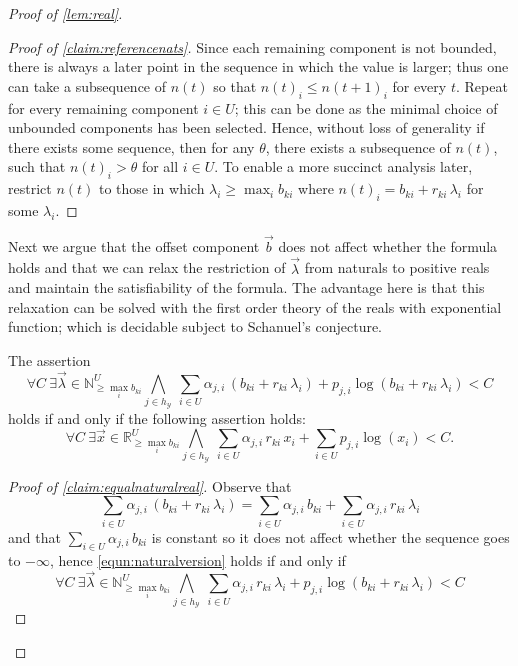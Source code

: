 \documentclass[10pt,a4paper]{amsart}
\numberwithin{equation}{section}
\theoremstyle{plain}
\theoremstyle{definition}
\theoremstyle{remark}
\newenvironment{subproof}[1][\proofname]{\renewcommand{\qedsymbol}{{$\blacksquare$}}\begin{proof}[#1]}{\end{proof}}
\newcommand\revar{x}
\newcommand\revec{\vec{x}}
\newcommand\basevecraw{b}
\newcommand\basevec{\vec{\basevecraw}}
\newcommand\pvecraw{r}
\begin{document}
\begin{proof}[Proof of \cref{lem:real}]
\begin{subproof}[Proof of \cref{claim:referencenats}]
Since each remaining component is not bounded, there is always a later point in the sequence in which the value is larger; thus one can take a subsequence of $n(t)$ so that $n(t)_i \le n(t+1)_i$ for every $t$. Repeat for every remaining component $i \in U$; this can be done as  the minimal choice of unbounded components has been selected. Hence, without loss of generality if there exists some sequence, then for any $\theta$, there exists a subsequence of $n(t)$, such that $n(t)_i > \theta$ for all $i \in U$. To enable a more succinct analysis later, restrict $n(t)$ to those in which $\lambda_i \ge \max_i{\basevecraw_{ki}}$ where $n(t)_i = \basevecraw_{ki} + \pvecraw_{ki} \, \lambda_i$ for some $\lambda_i$.\end{subproof}

Next we argue that the offset component $\basevec$ does not affect whether the formula holds and that  we can relax the restriction of $\vec{\lambda}$ from naturals to positive reals and maintain the satisfiability of the formula.  The advantage here is that this relaxation can be solved with the first order theory of the reals with exponential function; which is decidable subject to Schanuel's conjecture.

\begin{clm}\label{claim:equalnaturalreal}The assertion
\begin{equation}\label{equn:naturalversion}
\forall C\  \exists \vec{\lambda} \in \mathbb{N}^{U}_{\ge \max_i{\basevecraw_{ki}}}
\bigwedge_{j \in h_\mathcal{Y}}\ \sum_{i \in U} \alpha_{j,i}\, (\basevecraw_{ki} + \pvecraw_{ki}\, \lambda_i) +  p_{j,i}\log(\basevecraw_{ki} + \pvecraw_{ki}\, \lambda_i) < C
\end{equation}
holds if and only if  the following assertion holds:
\begin{equation}\label{equn:realsversion}
\forall C\  \exists \revec \in \mathbb{R}^{U}_{\ge \max_i{\basevecraw_{ki}}}
\bigwedge_{j \in h_\mathcal{Y}}\ \sum_{i \in U} \alpha_{j,i}\, \pvecraw_{ki}\, \revar_i + \sum_{i \in U}  p_{j,i}\log(\revar_i) < C.
\end{equation}
\end{clm}

\begin{subproof}[Proof of \cref{claim:equalnaturalreal}]
Observe that \[\sum_{i \in U} \alpha_{j,i}\, (\basevecraw_{ki} + \pvecraw_{ki}\, \lambda_i) = \sum_{i \in U} \alpha_{j,i}\, \basevecraw_{ki} + \sum_{i \in U} \alpha_{j,i}\, \pvecraw_{ki}\, \lambda_i \] and that $\sum_{i \in U} \alpha_{j,i}\, \basevecraw_{ki}$ is constant so it does not affect whether the sequence goes to $-\infty$, hence \cref{equn:naturalversion}  holds if and only if
\begin{equation}
\forall C\  \exists \vec{\lambda} \in \mathbb{N}^{U}_{\ge \max_i{\basevecraw_{ki}}}
\bigwedge_{j \in h_\mathcal{Y}}\ \sum_{i \in U} \alpha_{j,i}\, \pvecraw_{ki}\, \lambda_i +  p_{j,i}\log(\basevecraw_{ki} + \pvecraw_{ki}\, \lambda_i) < C \end{equation}


\end{subproof}
\end{proof}
\end{document}
